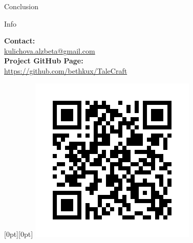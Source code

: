 \documentclass[portrait,a0paper,fontscale=0.34]{baposter}
\begin{document}
\begin{poster}
\begin{posterbox}[column=1, name=conclusion, below=result2, headerColorOne=yellow!80!orange!95!black, boxColorOne=yellow!33]{Conclusion}
\end{posterbox}


\begin{posterbox}[column=1, name=info, below=conclusion]{Info}

 


\vspace{5mm}
    \textbf{Contact:} \\
    \href{mailto:kulichova.alzbeta@gmail.com}{kulichova.alzbeta@gmail.com} \\[1ex]
    \textbf{Project GitHub Page:} \\
    \href{https://github.com/bethkux/TaleCraft}{https://github.com/bethkux/TaleCraft}\\
    



\begin{flushright}
\raisebox{10pt}[0pt][0pt]{%
\includegraphics[width=0.22\linewidth]{img/qr.png}%
}
\end{flushright}
\end{posterbox}




\end{poster}
\end{document}
